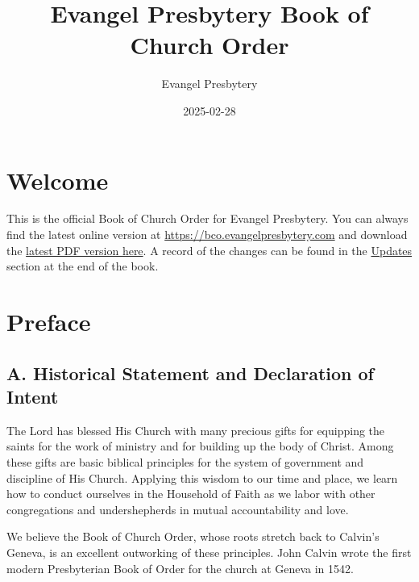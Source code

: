 \documentclass[
]{book}
\title{Evangel Presbytery Book of Church Order}
\author{Evangel Presbytery}
\date{2025-02-28}
\begin{document}
\maketitle



{
\hypersetup{linkcolor=}
\setcounter{tocdepth}{1}
\tableofcontents
}
\hypertarget{welcome}{%
\chapter*{Welcome}\label{welcome}}

This is the official Book of Church Order for Evangel Presbytery. You can always find the latest online version at \url{https://bco.evangelpresbytery.com} and download the \href{https://bco.evangelpresbytery.com/evangel-presbytery-bco.pdf}{latest PDF version here}. A record of the changes can be found in the \href{https://bco.evangelpresbytery.com/updates.html}{Updates} section at the end of the book.

\hypertarget{preface}{%
\chapter*{Preface}\label{preface}}

\protect\hypertarget{front-matter-preface}{\href{}{}}

\hypertarget{a.-historical-statement-and-declaration-of-intent}{%
\section*{A. Historical Statement and Declaration of Intent}\label{a.-historical-statement-and-declaration-of-intent}}

The Lord has blessed His Church with many precious gifts for equipping the saints for the work of ministry and for building up the body of Christ. Among these gifts are basic biblical principles for the system of government and discipline of His Church. Applying this wisdom to our time and place, we learn how to conduct ourselves in the Household of Faith as we labor with other congregations and undershepherds in mutual accountability and love.

We believe the Book of Church Order, whose roots stretch back to Calvin's Geneva, is an excellent outworking of these principles. John Calvin wrote the first modern Presbyterian Book of Order for the church at Geneva in 1542.
\end{document}
